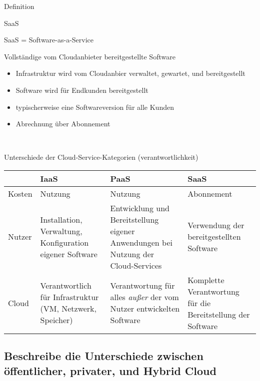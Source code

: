 \documentclass{scrartcl}
\newenvironment{flashcard}[2][]{%
    #1
    \vfill
    \centerline{\Large{#2}}
    \vfill
\newpage
}
{\newpage}
\newcommand{\subsectioncard}[1]{
    \vspace*{\stretch{1}}
    \subsection{#1}
    \vspace*{\stretch{1}}
    \pagebreak
}
\begin{document}
    \begin{flashcard}[Definition]{SaaS}
        SaaS = Software-as-a-Service

        Vollständige vom Cloudanbieter bereitgestellte Software
        \begin{itemize}
            \item Infrastruktur wird vom Cloudanbier verwaltet, gewartet, und bereitgestellt
            \item Software wird für Endkunden bereitgestellt
            \item typischerweise eine Softwareversion für alle Kunden
            \item Abrechnung über Abonnement
        \end{itemize}
    \end{flashcard}

    \begin{flashcard}[\ ]{Unterschiede der Cloud-Service-Kategorien (verantwortlichkeit)}
        \begin{tabular}{l|p{34mm}p{34mm}p{34mm}}
                 & \textbf{IaaS}                                             & \textbf{PaaS}                                                                     & \textbf{SaaS} \\
          \hline
          Kosten & Nutzung                                                   & Nutzung                                                                           & Abonnement                                                  \\
          Nutzer & Installation, Verwaltung, Konfiguration eigener Software  & Entwicklung und Bereitstellung eigener Anwendungen bei Nutzung der Cloud-Services & Verwendung der bereitgestellten Software                    \\
          Cloud  & Verantwortlich für Infrastruktur (VM, Netzwerk, Speicher) & Verantwortung für alles \emph{außer} der vom Nutzer entwickelten Software         & Komplette Verantwortung für die Bereitstellung der Software \\
        \end{tabular}
    \end{flashcard}

    \subsectioncard{Beschreibe die  Unterschiede zwischen öffentlicher, privater, und Hybrid Cloud}
\end{document}
